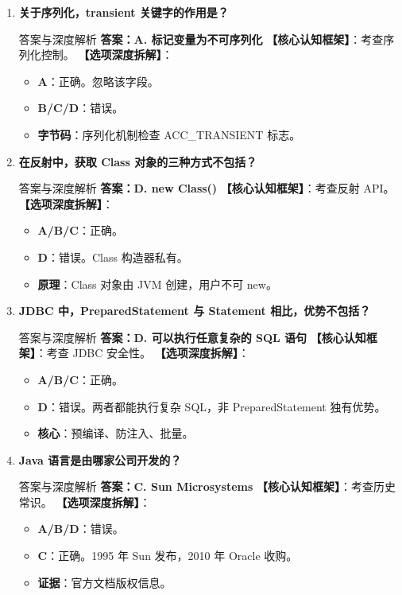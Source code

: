 \documentclass[12pt, a4paper]{ctexart}
\begin{document}
\begin{enumerate}[label=\arabic*.]
\item \textbf{关于序列化，transient 关键字的作用是？}
\begin{bluebox}{答案与深度解析}
\textbf{答案：A. 标记变量为不可序列化}
\textbf{【核心认知框架】}：考查序列化控制。
\textbf{【选项深度拆解】}：
\begin{itemize}[leftmargin=*, nosep]
    \item \textbf{A}：正确。忽略该字段。
    \item \textbf{B/C/D}：错误。
    \item \textbf{字节码}：序列化机制检查 ACC\_TRANSIENT 标志。
\end{itemize}
\end{bluebox}

\item \textbf{在反射中，获取 Class 对象的三种方式不包括？}
\begin{bluebox}{答案与深度解析}
\textbf{答案：D. new Class()}
\textbf{【核心认知框架】}：考查反射 API。
\textbf{【选项深度拆解】}：
\begin{itemize}[leftmargin=*, nosep]
    \item \textbf{A/B/C}：正确。
    \item \textbf{D}：错误。Class 构造器私有。
    \item \textbf{原理}：Class 对象由 JVM 创建，用户不可 new。
\end{itemize}
\end{bluebox}

\item \textbf{JDBC 中，PreparedStatement 与 Statement 相比，优势不包括？}
\begin{bluebox}{答案与深度解析}
\textbf{答案：D. 可以执行任意复杂的 SQL 语句}
\textbf{【核心认知框架】}：考查 JDBC 安全性。
\textbf{【选项深度拆解】}：
\begin{itemize}[leftmargin=*, nosep]
    \item \textbf{A/B/C}：正确。
    \item \textbf{D}：错误。两者都能执行复杂 SQL，非 PreparedStatement 独有优势。
    \item \textbf{核心}：预编译、防注入、批量。
\end{itemize}
\end{bluebox}

\item \textbf{Java 语言是由哪家公司开发的？}
\begin{bluebox}{答案与深度解析}
\textbf{答案：C. Sun Microsystems}
\textbf{【核心认知框架】}：考查历史常识。
\textbf{【选项深度拆解】}：
\begin{itemize}[leftmargin=*, nosep]
    \item \textbf{A/B/D}：错误。
    \item \textbf{C}：正确。1995 年 Sun 发布，2010 年 Oracle 收购。
    \item \textbf{证据}：官方文档版权信息。
\end{itemize}
\end{bluebox}
\end{enumerate}
\end{document}
